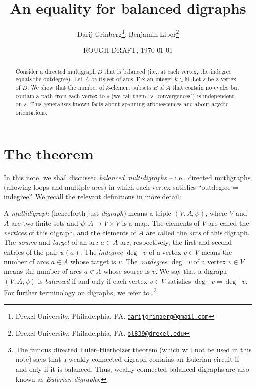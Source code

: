 \documentclass[numbers=enddot,12pt,final,onecolumn,notitlepage]{scrartcl}%
\theoremstyle{definition}
\theoremstyle{plainsl}
\begin{document}
\title{An equality for balanced digraphs}
\author{Darij Grinberg\thanks{Drexel University, Philadelphia, PA.
\href{mailto:darijgrinberg@gmail.com}{\texttt{darijgrinberg@gmail.com}}},
Benjamin Liber\thanks{Drexel University, Philadelphia, PA.
\href{mailto:bl839@drexel.edu}{\texttt{bl839@drexel.edu}}}}
\date{ROUGH DRAFT, \today}
\maketitle

\begin{abstract}
Consider a directed multigraph $D$ that is balanced (i.e., at each vertex, the
indegree equals the outdegree). Let $A$ be its set of arcs. Fix an integer
$k\in\mathbb{N}$. Let $s$ be a vertex of $D$. We show that the number of
$k$-element subsets $B$ of $A$ that contain no cycles but contain a path from
each vertex to $s$ (we call them \textquotedblleft$s$%
-convergences\textquotedblright) is independent on $s$. This generalizes known
facts about spanning arborescences and about acyclic orientations.

\end{abstract}

\section{The theorem}

In this note, we shall discussed \emph{balanced multidigraphs} -- i.e.,
directed mutligraphs (allowing loops and multiple arcs) in which each vertex
satisfies \textquotedblleft outdegree = indegree\textquotedblright. We recall
the relevant definitions in more detail:

A \emph{multidigraph} (henceforth just \emph{digraph}) means a triple
$(V,A,\psi)$, where $V$ and $A$ are two finite sets and $\psi: A \to V \times
V$ is a map. The elements of $V$ are called the \emph{vertices} of this
digraph, and the elements of $A$ are called the \emph{arcs} of this digraph.
The \emph{source} and \emph{target} of an arc $a \in A$ are, respectively, the
first and second entries of the pair $\psi(a)$. The \emph{indegree} $\deg
^{-}v$ of a vertex $v \in V$ means the number of arcs $a \in A$ whose target
is $v$. The \emph{outdegree} $\deg^{+}v$ of a vertex $v \in V$ means the
number of arcs $a \in A$ whose source is $v$. We say that a digraph
$(V,A,\psi)$ is \emph{balanced} if and only if each vertex $v \in V$ satisfies
$\deg^{+}v = \deg^{-}v$. For further terminology on digraphs, we refer to
\cite{22s}.\footnote{The famous directed Euler--Hierholzer theorem (which will
not be used in this note) says that a weakly connected digraph contains an
Eulerian circuit if and only if it is balanced. Thus, weakly connected
balanced digraphs are also known as \emph{Eulerian digraphs}.}
\end{document}
